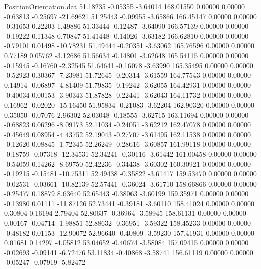 \begin{filecontents}{PositionOrientation.dat}
  51.18235   -0.05355   -3.64014   168.01550    0.00000    0.00000   -0.63813   -0.25697  -21.69621
  51.25443   -0.09955   -3.65866   166.45147    0.00000    0.00000   -0.31653    0.22203    1.49886
  51.33444   -0.12487   -3.64090   166.57139    0.00000    0.00000   -0.19222    0.11348    0.70847
  51.41448   -0.14026   -3.63182   166.62810    0.00000    0.00000   -0.79101    0.01498  -10.78231
  51.49444   -0.20351   -3.63062   165.76596    0.00000    0.00000    0.77189    0.05762   -3.12686
  51.56634   -0.14801   -3.62648   165.54115    0.00000    0.00000   -0.15945   -0.16760   -2.32545
  51.64641   -0.16078   -3.63990   165.35495    0.00000    0.00000   -0.52923    0.30367   -7.23981
  51.72645   -0.20314   -3.61559   164.77543    0.00000    0.00000    0.14914   -0.06897   -4.81409
  51.79835   -0.19242   -3.62055   164.42931    0.00000    0.00000   -0.40034    0.00153   -3.90343
  51.87828   -0.22441   -3.62043   164.11732    0.00000    0.00000    0.16962   -0.02020  -15.16450
  51.95834   -0.21083   -3.62204   162.90320    0.00000    0.00000    0.35050   -0.07076    2.96302
  52.03048   -0.18555   -3.62715   163.11694    0.00000    0.00000   -0.68823    0.06296   -8.09173
  52.11034   -0.24051   -3.62212   162.47078    0.00000    0.00000   -0.45649    0.08954   -4.43752
  52.19043   -0.27707   -3.61495   162.11538    0.00000    0.00000   -0.12620    0.08845   -1.72345
  52.26249   -0.28616   -3.60857   161.99118    0.00000    0.00000   -0.18759   -0.07318  -12.34531
  52.34241   -0.30116   -3.61442   161.00458    0.00000    0.00000   -0.54059    0.14262   -8.69750
  52.42236   -0.34438   -3.60302   160.30921    0.00000    0.00000   -0.19215   -0.15481  -10.75311
  52.49438   -0.35822   -3.61417   159.53470    0.00000    0.00000   -0.02531   -0.03661  -10.82139
  52.57441   -0.36024   -3.61710   158.66866    0.00000    0.00000   -0.25477    0.18879    8.63640
  52.65443   -0.38063   -3.60199   159.35971    0.00000    0.00000   -0.13980    0.01111  -11.87126
  52.73441   -0.39181   -3.60110   158.41024    0.00000    0.00000    0.30804    0.16194    2.79404
  52.80637   -0.36964   -3.58945   158.61131    0.00000    0.00000    0.00167   -0.04714   -1.98851
  52.88632   -0.36951   -3.59322   158.45233    0.00000    0.00000   -0.48182    0.01153  -12.90072
  52.96640   -0.40809   -3.59230   157.41931    0.00000    0.00000    0.01681    0.14297   -4.05812
  53.04652   -0.40674   -3.58084   157.09415    0.00000    0.00000   -0.02693   -0.09141   -6.72476
  53.11834   -0.40868   -3.58741   156.61119    0.00000    0.00000   -0.05247   -0.07919   -5.82472

\end{filecontents}
